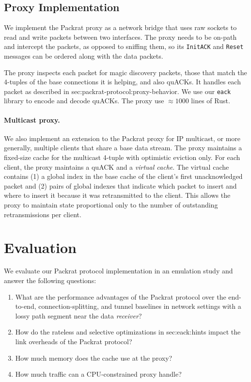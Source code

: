 \subsection{Proxy Implementation}

We implement the Packrat proxy as a network bridge that uses raw sockets to read
and write packets between two interfaces. The proxy needs to
be on-path and intercept the packets, as opposed to sniffing them, so
its \texttt{InitACK} and \texttt{Reset} messages can be ordered along with the
data packets.

The proxy inspects each packet for magic discovery packets, those that match the
4-tuples of the base connections it is helping, and also quACKs.
It handles each packet as described in \Cref
{sec:packrat-protocol:proxy-behavior}. We use our \texttt{eack} library to
encode and decode quACKs. The proxy use $\approx\!1000$ lines of Rust.

\paragraph{Multicast proxy.}

We also implement an extension to the Packrat proxy for IP multicast, or more
generally, multiple clients that share a base data stream. The proxy maintains
a fixed-size cache for the multicast 4-tuple with optimistic eviction only. For
each client, the proxy maintains a quACK and a \textit{virtual cache}. The
virtual cache contains (1) a global index in the base cache of the client's
first unacknowledged packet and (2) pairs of global indexes that indicate which
packet to insert and where to insert it because it was retransmitted to the
client. This allows the proxy to maintain state proportional only to the number
of outstanding retransmissions per client.

\section{Evaluation}

We evaluate our Packrat protocol implementation in an emulation study and answer
the following questions:
\begin{enumerate}[noitemsep]
    \item What are the performance advantages of the Packrat protocol over the
     end-to-end, connection-splitting, and tunnel baselines in network settings
     with a lossy path segment near the data \textit{receiver}?
    \item How do the rateless and selective optimizations in \Cref
     {sec:eack:hints} impact the link overheads of the Packrat protocol?
    \item How much memory does the cache use at the proxy?
    \item How much traffic can a CPU-constrained proxy handle?
\end{enumerate}

